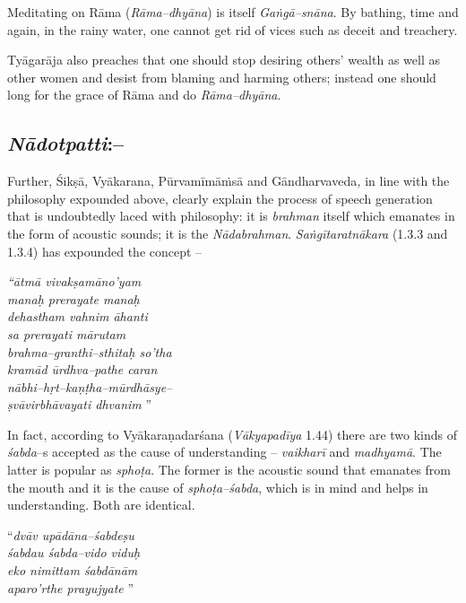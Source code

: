 Meditating on Rāma (\textit{Rāma–dhyāna}) is itself \textit{Gaṅgā–snāna}. By bathing, time and again, in the rainy water, one cannot get rid of vices such as deceit and treachery. 

Tyāgarāja also preaches that one should stop desiring others’ wealth as well as other women and desist from blaming and harming others; instead one should long for the grace of Rāma and do \textit{Rāma–dhyāna}.

\vspace{-.3cm}

\subsection*{\textit{Nādotpatti}:–}

Further, Śikṣā, Vyākarana, Pūrvamīmāṁsā and Gāndharvaveda\textit{,} in line with the philosophy expounded above, clearly explain the process of speech generation that is undoubtedly laced with philosophy: it is \textit{brahman} itself which emanates in the form of acoustic sounds; it is the \textit{Nādabrahman}. \textit{Saṅgītaratnākara} (1.3.3 and 1.3.4) has expounded the concept –

\begin{myquote}
\textit{“ātmā vivakṣamāno’yam}\\\textit{manaḥ prerayate manaḥ} \\\textit{dehastham vahnim āhanti}\\\textit{sa prerayati mārutam} \\\textit{brahma–granthi–sthitaḥ so’tha}\\\textit{kramād ūrdhva–pathe caran} \\\textit{nābhi–hṛt–kaṇṭha–mūrdhāsye–}\\\textit{ṣvāvirbhāvayati dhvanim} ”
\end{myquote}

In fact, according to Vyākaraṇadarśana (\textit{Vākyapadīya} 1.44) there are two kinds of \textit{śabda}–s accepted as the cause of understanding – \textit{vaikharī} and \textit{madhyamā}. The latter is popular as \textit{sphoṭa}. The former is the acoustic sound that emanates from the mouth and it is the cause of \textit{sphoṭa–śabda}, which is in mind and helps in understanding. Both are identical.

\begin{myquote}
“\textit{dvāv upādāna–śabdeṣu}\\\textit{śabdau śabda–vido viduḥ} \\\textit{eko nimittam śabdānām}\\\textit{aparo’rthe prayujyate} ”
\end{myquote}

